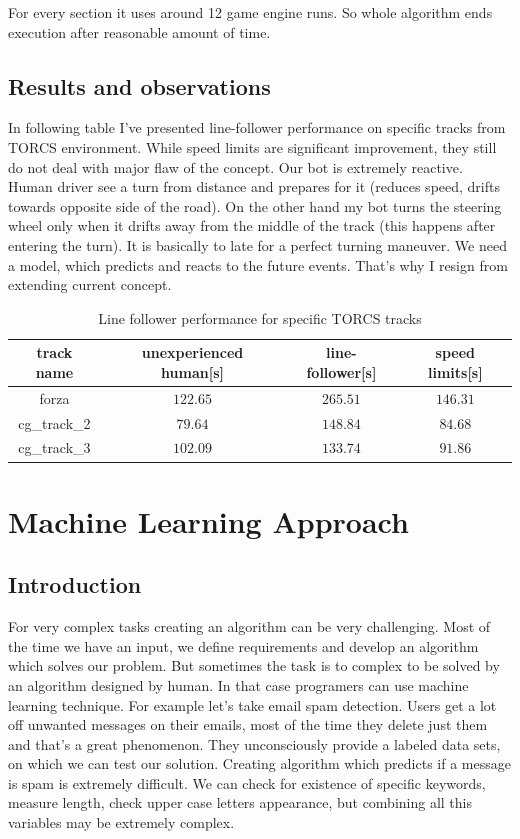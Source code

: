 \documentclass[declaration,shortabstract,english,inz]{iithesis}
\begin{document}
For every section it uses around 12 game engine runs.
So whole algorithm ends execution after reasonable amount of time.

\section{Results and observations}

In following table I've presented line-follower performance on specific tracks from TORCS environment.
While speed limits are significant improvement, they still do not deal with major flaw of the concept.
Our bot is extremely reactive.
Human driver see a turn from distance and prepares for it (reduces speed, drifts towards opposite side of the road).
On the other hand my bot turns the steering wheel only when it drifts away from the middle of the track (this happens after entering the turn).
It is basically to late for a perfect turning maneuver.
We need a model, which predicts and reacts to the  future events.
That's why I resign from extending current concept.


\begin{table}[h]
    \centering
    \begin{tabular}{ |c|c|c|c|}
          \hline
          track name & unexperienced human[s] & line-follower[s] & speed limits[s]  \\
          \hline
          forza &  $122.65$ & $265.51$ & $146.31$   \\
          \hline
          cg\_track\_2 & $79.64$ & $148.84$ &  $84.68$  \\ 
          \hline
          cg\_track\_3 & $102.09$ & $133.74$ & $91.86$   \\
          \hline
        \end{tabular}
        \caption{Line follower performance for specific TORCS tracks}
        \label{tab:line_follower}

\end{table}

\chapter{Machine Learning Approach}

\section{Introduction}


For very complex tasks creating an algorithm can be very challenging.
 Most of the time we have an input, we define requirements and develop an algorithm which solves our problem.
But sometimes the task is to complex to be solved by an algorithm designed by human.
In that case programers can use machine learning technique.
For example let's take email spam detection.
Users get a lot off unwanted messages on their emails, most of the time they delete just them and that's a great phenomenon.
They unconsciously provide a labeled data sets, on which we can test our solution.
Creating algorithm which predicts if a message is spam is extremely difficult.
We can check for existence of specific keywords, measure length, check upper case letters appearance, but combining all this variables may be extremely complex.
\end{document}
